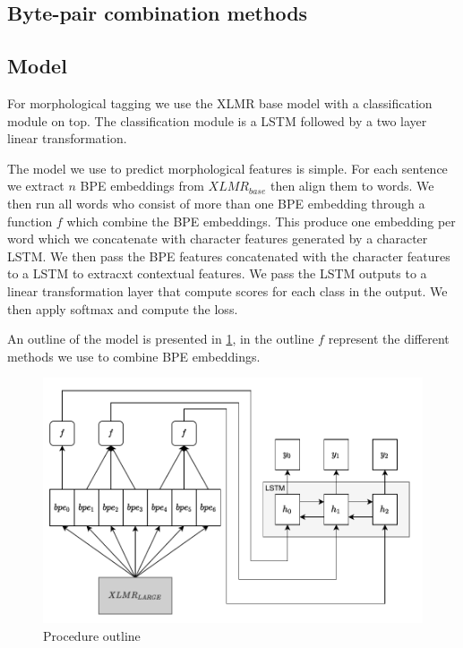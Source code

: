 \documentclass[11pt]{article}
\begin{document}
	\subsection{Byte-pair combination methods}
	


	
	\subsection{Model}
	For morphological tagging we use the XLMR base model with a classification module on top. The classification module is a LSTM followed by a two layer linear transformation. 
	
	The model we use to predict morphological features is simple. For each sentence we extract $n$ BPE embeddings from $XLMR_{base}$ then align them to words. 
	We then run all words who consist of more than one BPE embedding through a function $f$ which combine the BPE embeddings. This produce one embedding per word which we concatenate with character features generated by a character LSTM. We then pass the BPE features concatenated with the character features to a LSTM to extracxt contextual features.
	We pass the LSTM outputs to a linear transformation layer that compute scores for each class in the output. We then apply softmax and compute the loss.
	
	An outline of the model is presented in \cref{fig:model}, in the outline $f$ represent the different methods we use to combine BPE embeddings.
	
	\begin{figure}[h!]
		\centering
		\includegraphics[scale=0.2]{model_outline-5.pdf}
		\caption{\label{fig:model} Procedure outline}
	\end{figure}
	
\end{document}

